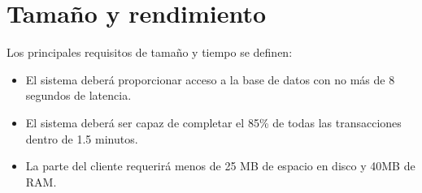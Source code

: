 \documentclass[12pt,a4paper]{article}
\begin{document}
\section{Tamaño y rendimiento}

Los principales requisitos de tamaño y tiempo se definen:

\begin{itemize}
  \item El sistema deberá proporcionar acceso a la base de datos con no más de 8 segundos de latencia.
  \item El sistema deberá ser capaz de completar el 85\% de todas las transacciones dentro de 1.5 minutos.
  \item La parte del cliente requerirá menos de 25 MB de espacio en disco y 40MB de RAM.
\end{itemize}
\end{document}
